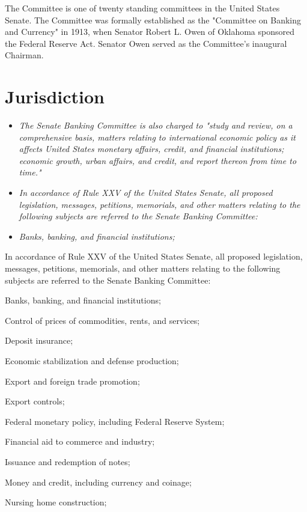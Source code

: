 The Committee is one of twenty standing committees in the United States
Senate. The Committee was formally established as the "Committee on
Banking and Currency" in 1913, when Senator Robert L. Owen of Oklahoma
sponsored the Federal Reserve Act. Senator Owen served as the
Committee's inaugural Chairman.

\section{Jurisdiction}\label{jurisdiction}

\begin{itemize}
\item
  \emph{The Senate Banking Committee is also charged to "study and
  review, on a comprehensive basis, matters relating to international
  economic policy as it affects United States monetary affairs, credit,
  and financial institutions; economic growth, urban affairs, and
  credit, and report thereon from time to time."}
\item
  \emph{In accordance of Rule XXV of the United States Senate, all
  proposed legislation, messages, petitions, memorials, and other
  matters relating to the following subjects are referred to the Senate
  Banking Committee:}
\item
  \emph{Banks, banking, and financial institutions;}
\end{itemize}

In accordance of Rule XXV of the United States Senate, all proposed
legislation, messages, petitions, memorials, and other matters relating
to the following subjects are referred to the Senate Banking Committee:

Banks, banking, and financial institutions;

Control of prices of commodities, rents, and services;

Deposit insurance;

Economic stabilization and defense production;

Export and foreign trade promotion;

Export controls;

Federal monetary policy, including Federal Reserve System;

Financial aid to commerce and industry;

Issuance and redemption of notes;

Money and credit, including currency and coinage;

Nursing home construction;

